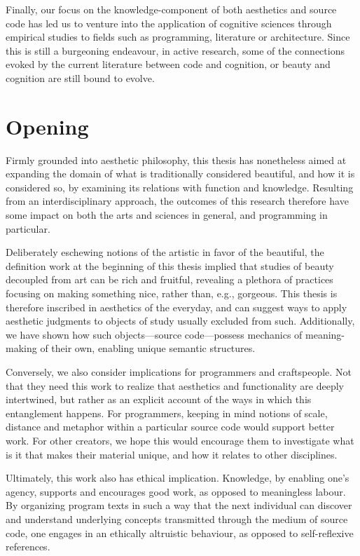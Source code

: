Finally, our focus on the knowledge-component of both aesthetics and source code has led us to venture into the application of cognitive sciences through empirical studies to fields such as programming, literature or architecture. Since this is still a burgeoning endeavour, in active research,  some of the connections evoked by the current literature between code and cognition, or beauty and cognition are still bound to evolve.

\section{Opening}

Firmly grounded into aesthetic philosophy, this thesis has nonetheless aimed at expanding the domain of what is traditionally considered beautiful, and how it is considered so, by examining its relations with function and knowledge. Resulting from an interdisciplinary approach, the outcomes of this research therefore have some impact  on both the arts and sciences in general, and programming in particular.

Deliberately eschewing notions of the artistic in favor of the beautiful, the definition work at the beginning of this thesis implied that studies of beauty decoupled from art can be rich and fruitful, revealing a plethora of practices focusing on making something nice, rather than, e.g., gorgeous. This thesis is therefore inscribed in aesthetics of the everyday, and can suggest ways to apply aesthetic judgments to objects of study usually excluded from such. Additionally, we have shown how such objects—source code—possess mechanics of meaning-making of their own, enabling unique semantic structures.

Conversely, we also consider implications for programmers and craftspeople. Not that they need this work to realize that aesthetics and functionality are deeply intertwined, but rather as an explicit account of the ways in which this entanglement happens. For programmers, keeping in mind notions of scale, distance and metaphor within a particular source code would support better work. For other creators, we hope this would encourage them to investigate what is it that makes their material unique, and how it relates to other disciplines.

Ultimately, this work also has ethical implication. Knowledge, by enabling one's agency, supports and encourages good work, as opposed to meaningless labour. By organizing program texts in such a way that the next individual can discover and understand underlying concepts transmitted through the medium of source code, one engages in an ethically altruistic behaviour, as opposed to self-reflexive references.

